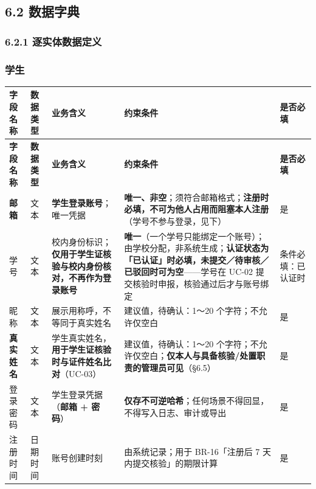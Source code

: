\documentclass[12pt,a4paper]{ctexart}
\begin{document}
\subsection*{6.2 数据字典}

\subsubsection*{6.2.1 逐实体数据定义}

\subsubsection*{学生}

{\scriptsize
\begin{longtable}{|p{1.48cm}|p{1.48cm}|p{3.76cm}|p{7.73cm}|p{1.54cm}|}
\hline
\textbf{字段名称} & \textbf{数据类型} & \textbf{业务含义} & \textbf{约束条件} & \textbf{是否必填} \\
\hline
\endfirsthead
\hline
\textbf{字段名称} & \textbf{数据类型} & \textbf{业务含义} & \textbf{约束条件} & \textbf{是否必填} \\
\hline
\endhead
\hline
\endfoot
\textbf{邮箱} & 文本 & \textbf{学生登录账号}；唯一凭据 & \textbf{唯一、非空}；须符合邮箱格式；\textbf{注册时必填，不可为他人占用而阻塞本人注册}（学号不参与登录，见下） & 是 \\
\hline
学号 & 文本 & 校内身份标识；\textbf{仅用于学生证核验与校内身份核对，不再作为登录账号} & \textbf{唯一}（一个学号只能绑定一个账号）；由学校分配，非系统生成；\textbf{认证状态为「已认证」时必填，未提交／待审核／已驳回时可为空}——学号在 UC-02 提交核验时申报，核验通过后才与账号绑定 & 条件必填：已认证时 \\
\hline
昵称 & 文本 & 展示用称呼，不等同于真实姓名 & 建议值，待确认：1～20 个字符；不允许仅空白 & 是 \\
\hline
\textbf{真实姓名} & 文本 & 学生真实姓名，\textbf{用于学生证核验时与证件姓名比对}（UC-03） & 建议值，待确认：1～20 个字符；不允许仅空白；\textbf{仅本人与具备核验/处置职责的管理员可见}（§6.5） & 是 \\
\hline
登录密码 & 文本 & 学生登录凭据（\textbf{邮箱 + 密码}） & \textbf{仅存不可逆哈希}；任何场景不得回显，不得写入日志、审计或导出 & 是 \\
\hline
注册时间 & 日期时间 & 账号创建时刻 & 由系统记录；用于 BR-16「注册后 7 天内提交核验」的期限计算 & 是 \\
\hline

\end{longtable}}
\end{document}
